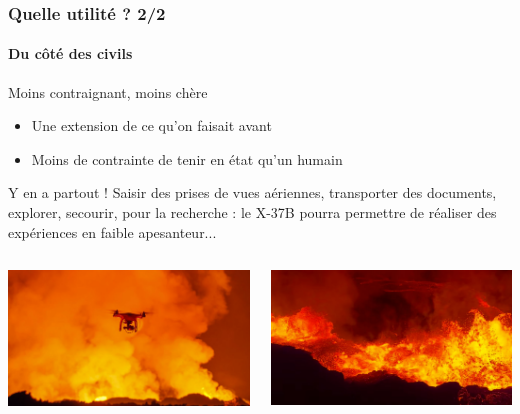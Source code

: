 \documentclass{beamer}
\begin{document}
\begin{frame}
  \frametitle{Quelle utilité ? 2/2}
  \framesubtitle{Du côté des civils}
  \begin{block}{Moins contraignant, moins chère}
    \begin{itemize}
      \item Une extension de ce qu'on faisait avant
      \item Moins de contrainte de tenir en état qu'un humain
    \end{itemize}
  \end{block}
  \begin{block}{Y en a partout !}
    Saisir des prises de vues aériennes, transporter des documents, explorer, secourir, pour la recherche : le X-37B pourra permettre de réaliser des expériences en faible apesanteur...
  \end{block}
  \begin{columns}
    \begin{column}{.5\textwidth}
      \begin{center}
        \includegraphics[width=.7\textwidth]{../Images/dangereux.jpg}
      \end{center}
    \end{column}
    \begin{column}{.5\textwidth}
      \begin{center}
        \includegraphics[width=.7\textwidth]{../Images/dangereux2.jpg}
      \end{center}
    \end{column}
  \end{columns}
\end{frame}
\end{document}
